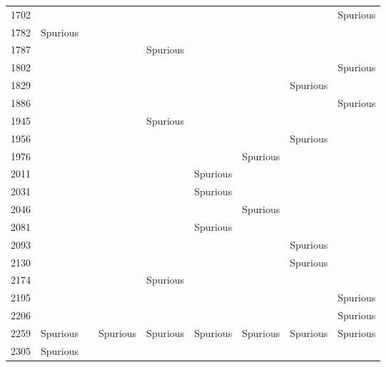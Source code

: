 \begin{table}
\begin{tabular}{lllllllll}
1702  &              &              &              &              &              &              &              & Spurious \\
1782  & Spurious \\
1787  &              &              &              & Spurious \\
1802  &              &              &              &              &              &              &              & Spurious \\
1829  &              &              &              &              &              &              & Spurious \\
1886  &              &              &              &              &              &              &              & Spurious \\
1945  &              &              &              & Spurious \\
1956  &              &              &              &              &              &              & Spurious \\
1976  &              &              &              &              &              & Spurious \\
2011  &              &              &              &             & Spurious \\
2031  &              &              &              &             & Spurious \\
2046  &              &              &              &              &              & Spurious \\
2081  &              &              &              &             & Spurious \\
2093  &              &              &              &              &              &              & Spurious \\
2130  &              &              &              &              &              &              & Spurious \\
2174  &              &              &              & Spurious \\
2195  &              &              &              &              &              &              &              & Spurious \\
2206  &              &              &              &              &              &              &              & Spurious \\
2259  & Spurious     &              & Spurious     & Spurious    & Spurious      & Spurious     & Spurious     & Spurious \\
2305  & Spurious \\

\end{tabular}
\end{table}
